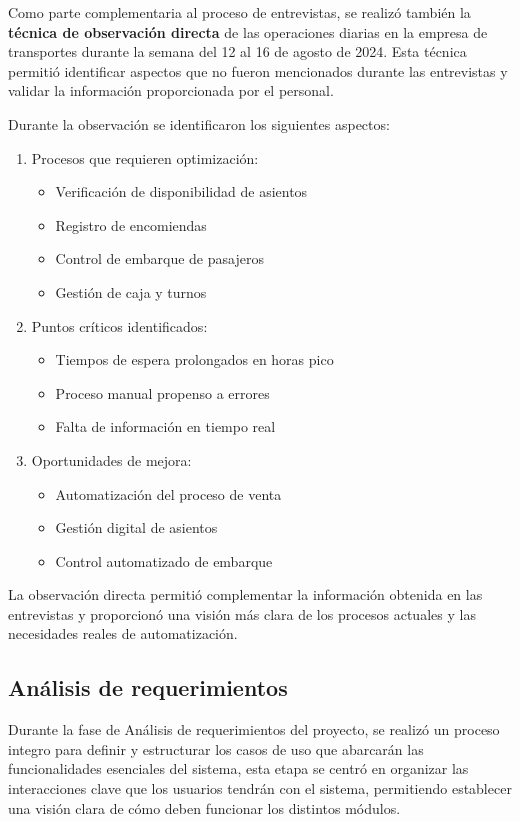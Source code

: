 	Como parte complementaria al proceso de entrevistas, se realizó también la \textbf{técnica de observación directa} de las operaciones diarias en la empresa de transportes durante la semana del 12 al 16 de agosto de 2024. Esta técnica permitió identificar aspectos que no fueron mencionados durante las entrevistas y validar la información proporcionada por el personal.
	
	Durante la observación se identificaron los siguientes aspectos:
	
	\begin{enumerate}[left=0.1cm, labelsep = 0.9cm, topsep = 0pt, parsep = 0pt]
		\item Procesos que requieren optimización:
		\begin{itemize}[label=$-$, left=0cm, labelsep = 0.9cm, topsep = 0pt, parsep = 0pt]
			\item Verificación de disponibilidad de asientos
			\item Registro de encomiendas
			\item Control de embarque de pasajeros
			\item Gestión de caja y turnos
		\end{itemize}		
		\item Puntos críticos identificados:
		\begin{itemize}[label=$-$, left=0cm, labelsep = 0.9cm, topsep = 0pt, parsep = 0pt]
			\item Tiempos de espera prolongados en horas pico
			\item Proceso manual propenso a errores
			\item Falta de información en tiempo real
		\end{itemize}
		\item Oportunidades de mejora:
		\begin{itemize}[label=$-$, left=0cm, labelsep = 0.9cm, topsep = 0pt, parsep = 0pt]
			\item Automatización del proceso de venta
			\item Gestión digital de asientos
			\item Control automatizado de embarque
		\end{itemize}
	\end{enumerate}
	
	La observación directa permitió complementar la información obtenida en las entrevistas y proporcionó una visión más clara de los procesos actuales y las necesidades reales de automatización.

	\subsection{Análisis de requerimientos}
	Durante la fase de Análisis de requerimientos del proyecto, se realizó un proceso integro para definir y estructurar los casos de uso que abarcarán las funcionalidades esenciales del sistema, esta etapa se centró en organizar las interacciones clave que los usuarios tendrán con el sistema, permitiendo establecer una visión clara de cómo deben funcionar los distintos módulos.
	
